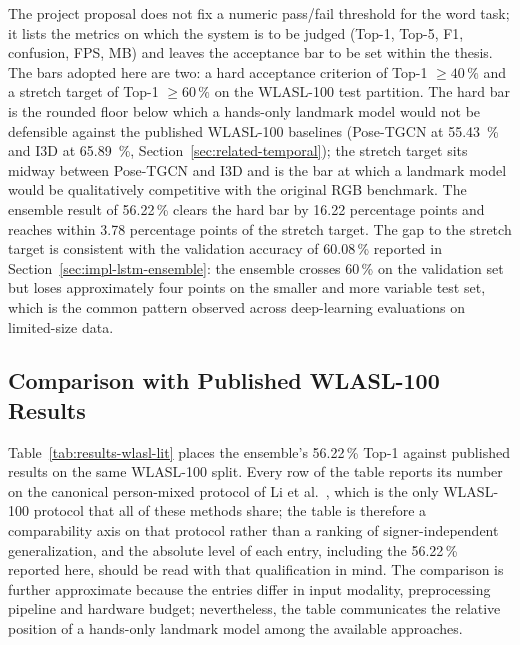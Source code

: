 The project proposal does not fix a numeric pass/fail threshold for
the word task; it lists the metrics on which the system is to be
judged (Top-1, Top-5, F1, confusion, FPS, MB) and leaves the
acceptance bar to be set within the thesis. The bars adopted here
are two: a hard acceptance criterion of Top-1 $\geq 40\,\%$ and a
stretch target of Top-1 $\geq 60\,\%$ on the WLASL-100 test
partition. The hard bar is the rounded floor below which a hands-only
landmark model would not be defensible against the published
WLASL-100 baselines (Pose-TGCN at \SI{55.43}{\percent} and I3D at
\SI{65.89}{\percent}, Section~\ref{sec:related-temporal}); the
stretch target sits midway between Pose-TGCN and I3D and is the bar
at which a landmark model would be qualitatively competitive with
the original RGB benchmark. The ensemble result of
56.22\,\% clears the hard bar by 16.22 percentage points and reaches
within 3.78 percentage points of the stretch target. The
gap to the stretch target is consistent with the validation accuracy
of 60.08\,\% reported in Section~\ref{sec:impl-lstm-ensemble}: the
ensemble crosses 60\,\% on the validation set but loses approximately
four points on the smaller and more variable test set, which is the
common pattern observed across deep-learning evaluations on
limited-size data.

\subsection{Comparison with Published WLASL-100 Results}
\label{sec:results-words-literature}

Table~\ref{tab:results-wlasl-lit} places the ensemble's 56.22\,\% Top-1
against published results on the same WLASL-100 split. Every row of the
table reports its number on the canonical person-mixed protocol of
Li et al.~\cite{li2020wlasl}, which is the only WLASL-100 protocol that
all of these methods share; the table is therefore a comparability axis
on that protocol rather than a ranking of signer-independent
generalization, and the absolute level of each entry, including the
56.22\,\% reported here, should be read with that qualification in
mind. The comparison is further approximate because the entries
differ in input modality, preprocessing pipeline and hardware budget;
nevertheless, the table communicates the relative position of a
hands-only landmark model among the available approaches.

